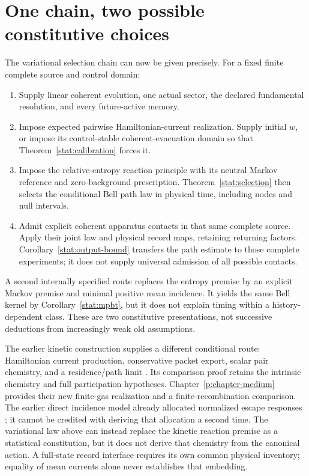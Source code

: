 \documentclass[11pt,oneside,openany]{book}
\theoremstyle{definition}
\theoremstyle{remark}\newtheorem{remark}[theorem]{Remark}
\begin{document}
\section{One chain, two possible constitutive choices}

The variational selection chain can now be given precisely.
For a fixed finite complete source and control domain:
\begin{enumerate}
 \item Supply linear coherent evolution, one actual sector, the declared
       fundamental resolution, and every future-active memory.
 \item Impose expected pairwise Hamiltonian-current realization.
       Supply initial $w$, or impose its control-stable coherent-evacuation
       domain so that Theorem~\ref{stat:calibration} forces it.
 \item Impose the relative-entropy reaction principle with its neutral
       Markov reference and zero-background prescription.
       Theorem~\ref{stat:selection} then selects the conditional Bell path
       law in physical time, including nodes and null intervals.
 \item Admit explicit coherent apparatus contacts in that same complete
       source. Apply their joint law and physical record maps, retaining
       returning factors. Corollary~\ref{stat:output-bound} transfers the
       path estimate to those complete experiments; it does not supply
       universal admission of all possible contacts.
\end{enumerate}
A second internally specified route replaces the entropy premise by an
explicit Markov premise and minimal positive mean incidence. It yields the
same Bell kernel by Corollary~\ref{stat:mpbt}, but it does not explain timing
within a history-dependent class. These are two constitutive presentations,
not successive deductions from increasingly weak old assumptions.

The earlier kinetic construction supplies a different conditional route:
Hamiltonian current production, conservative packet export, scalar pair
chemistry, and a residence/path limit \cite{M01}. Its comparison proof
retains the intrinsic chemistry and full participation hypotheses.
Chapter~\ref{p:chapter-medium} provides their new finite-gas realization
and a finite-recombination comparison. The earlier direct incidence model
already allocated normalized escape responses \cite{M02}; it cannot be
credited with deriving that allocation a second time. The variational law
above can instead replace the kinetic reaction premise as a statistical
constitution, but it does not derive that chemistry from the canonical
action. A full-state record interface requires its own common physical
inventory; equality of mean currents alone never establishes that embedding.
\end{document}

